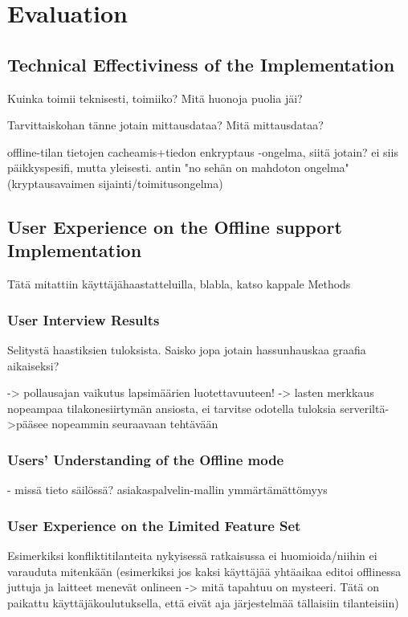 \chapter{Evaluation}


\section{Technical Effectiviness of the Implementation}


Kuinka toimii teknisesti, toimiiko? Mitä huonoja puolia jäi?

Tarvittaiskohan tänne jotain mittausdataa? Mitä mittausdataa?

offline-tilan tietojen cacheamis+tiedon enkryptaus -ongelma, siitä jotain? ei siis päikkyspesifi, mutta yleisesti. antin "no sehän on mahdoton ongelma" (kryptausavaimen sijainti/toimitusongelma)
 



\section{User Experience on the Offline support Implementation}
Tätä mitattiin käyttäjähaastatteluilla, blabla, katso kappale Methods

\subsection{User Interview Results}
Selitystä haastiksien tuloksista. Saisko jopa jotain hassunhauskaa graafia aikaiseksi?

-> pollausajan vaikutus lapsimäärien luotettavuuteen!
-> lasten merkkaus nopeampaa tilakonesiirtymän ansiosta, ei tarvitse odotella tuloksia serveriltä->pääsee nopeammin seuraavaan tehtävään

\subsection{Users' Understanding of the Offline mode}
- missä tieto säilössä? asiakaspalvelin-mallin ymmärtämättömyys



\subsection{User Experience on the Limited Feature Set}
Esimerkiksi konfliktitilanteita nykyisessä ratkaisussa ei huomioida/niihin ei varauduta mitenkään (esimerkiksi jos kaksi käyttäjää yhtäaikaa editoi offlinessa juttuja ja laitteet menevät onlineen -> mitä tapahtuu on mysteeri. Tätä on paikattu käyttäjäkoulutuksella, että eivät aja järjestelmää tällaisiin tilanteisiin) 

